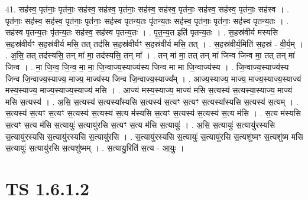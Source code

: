 \documentclass[17pt]{extarticle}
\begin{document}
41. सह॑स्व॒ पृत॑नाः॒ पृत॑नाः॒ सह॑स्व॒ सह॑स्व॒ पृत॑नाः॒ सह॑स्व॒ सह॑स्व॒ पृत॑नाः॒ सह॑स्व॒ सह॑स्व॒ पृत॑नाः॒ सह॑स्व । . पृत॑नाः॒ सह॑स्व॒ सह॑स्व॒ पृत॑नाः॒ पृत॑नाः॒ सह॑स्व पृतन्य॒तः पृ॑तन्य॒तः सह॑स्व॒ पृत॑नाः॒ पृत॑नाः॒ सह॑स्व पृतन्य॒तः । . सह॑स्व पृतन्य॒तः पृ॑तन्य॒तः सह॑स्व॒ सह॑स्व पृतन्य॒तः । . पृ॒त॒न्य॒त इति॑ पृतन्य॒तः । . स॒हस्र॑वीर्य मस्यसि स॒हस्र॑वीर्यꣳ स॒हस्र॑वीर्य मसि॒ तत् तद॑सि स॒हस्र॑वीर्यꣳ स॒हस्र॑वीर्य मसि॒ तत् । . स॒हस्र॑वीर्य॒मिति॑ स॒हस्र॑ - वी॒र्य॒म् । . अ॒सि॒ तत् तद॑स्यसि॒ तन् मा॑ मा॒ तद॑स्यसि॒ तन् मा᳚ । . तन् मा॑ मा॒ तत् तन् मा॑ जिन्व जिन्व मा॒ तत् तन् मा॑ जिन्व । . मा॒ जि॒न्व॒ जि॒न्व॒ मा॒ मा॒ जि॒न्वाज्य॒स्याज्य॑स्य जिन्व मा मा जि॒न्वाज्य॑स्य । . जि॒न्वाज्य॒स्याज्य॑स्य जिन्व जि॒न्वाज्य॒स्याज्य॒ माज्य॒ माज्य॑स्य जिन्व जि॒न्वाज्य॒स्याज्य᳚म् । . आज्य॒स्याज्य॒ माज्य॒ माज्य॒स्याज्य॒स्याज्य॑ मस्य॒स्याज्य॒ माज्य॒स्याज्य॒स्याज्य॑ मसि । . आज्य॑ मस्य॒स्याज्य॒ माज्य॑ मसि स॒त्यस्य॑ स॒त्यस्या॒स्याज्य॒ माज्य॑ मसि स॒त्यस्य॑ । . अ॒सि॒ स॒त्यस्य॑ स॒त्यस्या᳚स्यसि स॒त्यस्य॑ स॒त्यꣳ स॒त्यꣳ स॒त्यस्या᳚स्यसि स॒त्यस्य॑ स॒त्यम् । . स॒त्यस्य॑ स॒त्यꣳ स॒त्यꣳ स॒त्यस्य॑ स॒त्यस्य॑ स॒त्य म॑स्यसि स॒त्यꣳ स॒त्यस्य॑ स॒त्यस्य॑ स॒त्य म॑सि । . स॒त्य म॑स्यसि स॒त्यꣳ स॒त्य म॑सि स॒त्यायुः॑ स॒त्यायु॑रसि स॒त्यꣳ स॒त्य म॑सि स॒त्यायुः॑ । . अ॒सि॒ स॒त्यायुः॑ स॒त्यायु॑रस्यसि स॒त्यायु॑रस्यसि स॒त्यायु॑रस्यसि स॒त्यायु॑रसि । . स॒त्यायु॑रस्यसि स॒त्यायुः॑ स॒त्यायु॑रसि स॒त्यशु॑ष्मꣳ स॒त्यशु॑ष्म मसि स॒त्यायुः॑ स॒त्यायु॑रसि स॒त्यशु॑ष्मम् । . स॒त्यायु॒रिति॑ स॒त्य - आ॒युः॒ । \newline
\pagebreak
{}
\section*{ TS 1.6.1.2 }
\end{document}
